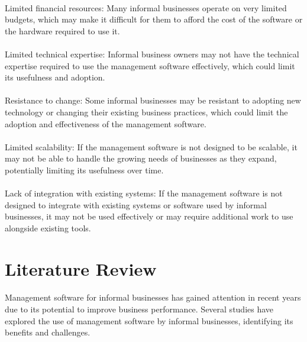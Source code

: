 \documentclass{article}
\begin{document}
\paragraph*{}
Limited financial resources: Many informal businesses operate on very limited budgets, which may make it difficult for them to afford the cost of the software or the hardware required to use it.

\paragraph*{}
Limited technical expertise: Informal business owners may not have the technical expertise required to use the management software effectively, which could limit its usefulness and adoption.

\paragraph*{}
Resistance to change: Some informal businesses may be resistant to adopting new technology or changing their existing business practices, which could limit the adoption and effectiveness of the management software.

\paragraph*{}
Limited scalability: If the management software is not designed to be scalable, it may not be able to handle the growing needs of businesses as they expand, potentially limiting its usefulness over time.

\paragraph*{}
Lack of integration with existing systems: If the management software is not designed to integrate with existing systems or software used by informal businesses, it may not be used effectively or may require additional work to use alongside existing tools.
\newpage


\section{Literature Review}
\paragraph*{}
Management software for informal businesses has gained attention in recent years due to its potential to improve business performance. Several studies have explored the use of management software by informal businesses, identifying its benefits and challenges.
\end{document}
